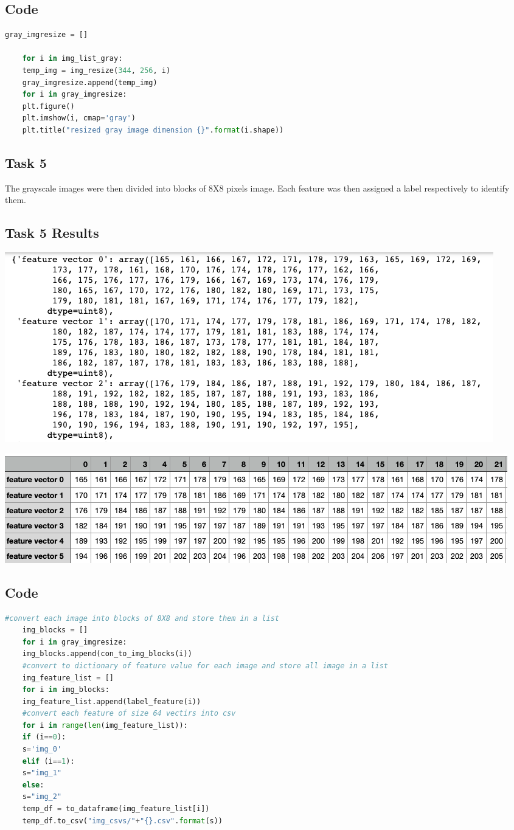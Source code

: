 \documentclass{article}
\begin{document}
	\subsection{Code}
	\begin{lstlisting}[language=Python]
	gray_imgresize = []
	
	for i in img_list_gray:
	temp_img = img_resize(344, 256, i)
	gray_imgresize.append(temp_img)
	for i in gray_imgresize:
	plt.figure()
	plt.imshow(i, cmap='gray')
	plt.title("resized gray image dimension {}".format(i.shape))
	\end{lstlisting}

\begin{multicols}{2}
	\section{Task 5}
	The grayscale images were then divided into blocks of 8X8 pixels image. Each feature was then assigned a label respectively to identify them. 
	\subsection{Task 5 Results}
	\centering
		\includegraphics[scale=0.2]{../screenshots/feature_vector88.png}
	
	\centering
		\includegraphics[scale=0.25]{../screenshots/88csv.png}
	\end{multicols}
	
	\pagebreak
	\subsection{Code}
	\begin{lstlisting}[language=Python]
	#convert each image into blocks of 8X8 and store them in a list 
	img_blocks = []
	for i in gray_imgresize:
	img_blocks.append(con_to_img_blocks(i))
	#convert to dictionary of feature value for each image and store all image in a list
	img_feature_list = []
	for i in img_blocks:
	img_feature_list.append(label_feature(i))
	#convert each feature of size 64 vectirs into csv
	for i in range(len(img_feature_list)):
	if (i==0):
	s='img_0'
	elif (i==1):
	s="img_1"
	else:
	s="img_2"
	temp_df = to_dataframe(img_feature_list[i])
	temp_df.to_csv("img_csvs/"+"{}.csv".format(s))
	\end{lstlisting}
\end{document}
